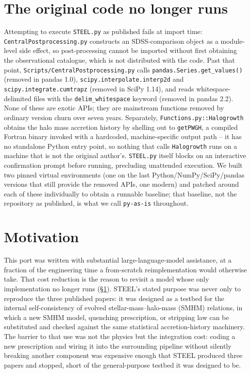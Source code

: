 \documentclass[fleqn,usenatbib]{mnras}
\begin{document}
\section{The original code no longer runs}
\label{sec:repro}

Attempting to execute \texttt{STEEL.py} as published fails at import time:
\texttt{CentralPostprocessing.py} constructs an SDSS-comparison object as
a module-level side effect, so post-processing cannot be imported without
first obtaining the observational catalogue, which is not distributed
with the code. Past that point, \texttt{Scripts/CentralPostprocessing.py}
calls \texttt{pandas.Series.get\_values()} (removed in pandas 1.0),
\texttt{scipy.interpolate.interp2d} and
\texttt{scipy.integrate.cumtrapz} (removed in SciPy 1.14), and reads
whitespace-delimited files with the \texttt{delim\_whitespace} keyword
(removed in pandas 2.2). None of these are exotic APIs; they are
mainstream functions removed by ordinary version churn over seven years.
Separately, \texttt{Functions.py::Halogrowth} obtains the halo mass
accretion history by shelling out to \texttt{getPWGH}, a compiled Fortran
binary invoked with a hardcoded, machine-specific output path -- it has
no standalone Python entry point, so nothing that calls \texttt{Halogrowth}
runs on a machine that is not the original author's. \texttt{STEEL.py}
itself blocks on an interactive confirmation prompt before running,
precluding unattended execution. We built two pinned virtual
environments (one on the last Python/NumPy/SciPy/pandas versions that
still provide the removed APIs, one modern) and patched around each of
these individually to obtain a runnable baseline; that baseline, not the
repository as published, is what we call \texttt{py-as-is} throughout.

\section{Motivation}
\label{sec:mot}

This port was written with substantial large-language-model assistance,
at a fraction of the engineering time a from-scratch reimplementation
would otherwise take. That cost reduction is the reason to revisit a
model whose only implementation no longer runs (\S\ref{sec:repro}).
STEEL's stated purpose was never only to reproduce the three published
papers: it was designed as a testbed for the internal self-consistency
of evolved stellar-mass--halo-mass (SMHM) relations, in which a new
SMHM model, quenching prescription, or stripping law can be substituted
and checked against the same statistical accretion-history machinery.
The barrier to that use was not the physics but the integration cost:
coding a new prescription and wiring it into the surrounding pipeline
without silently breaking another component was expensive enough that
STEEL produced three papers and stopped, short of the general-purpose
testbed it was designed to be.
\end{document}
